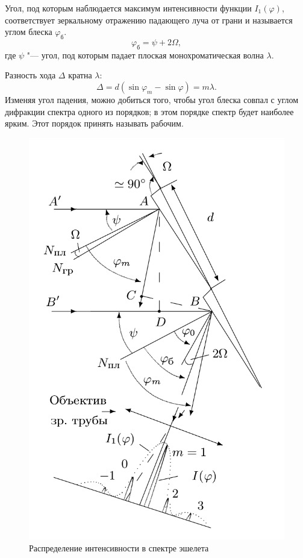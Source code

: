 \documentclass[a4paper, 12pt]{article}%
\begin{document}
	Угол, под которым наблюдается максимум интенсивности функции $I_{1} (\varphi)$, соответствует зеркальному отражению падающего луча от грани и называется углом блеска $\varphi_{б}$.
\begin{equation}
	\varphi_{б} = \psi + 2 \Omega,
\end{equation}
	где $\psi$ "--- угол, под которым падает плоская монохроматическая волна $\lambda$.
	
	Разность хода $\Delta$ кратна $\lambda$:
\begin{equation}
	\Delta = d (\sin \varphi_m - \sin \varphi) = m \lambda.
\end{equation}
	Изменяя угол падения, можно добиться того, чтобы угол блеска совпал с углом дифракции спектра одного из порядков; в этом порядке спектр будет наиболее ярким. Этот порядок принять называть рабочим.
	\begin{figure}[H]
		\begin{center}
		
		\includegraphics[width = 0.3\linewidth]{3.png}
		\caption{Распределение интенсивности в спектре эшелета}
		\end{center}
	\end{figure}
	
\end{document}

